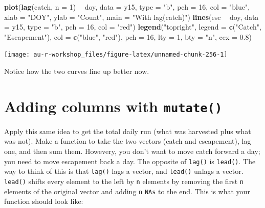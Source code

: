\documentclass[]{book}
\newenvironment{Shaded}{\begin{snugshade}}{\end{snugshade}}
\newcommand{\DataTypeTok}[1]{\textcolor[rgb]{0.13,0.29,0.53}{#1}}
\newcommand{\DecValTok}[1]{\textcolor[rgb]{0.00,0.00,0.81}{#1}}
\newcommand{\FloatTok}[1]{\textcolor[rgb]{0.00,0.00,0.81}{#1}}
\newcommand{\KeywordTok}[1]{\textcolor[rgb]{0.13,0.29,0.53}{\textbf{#1}}}
\newcommand{\NormalTok}[1]{#1}
\newcommand{\OperatorTok}[1]{\textcolor[rgb]{0.81,0.36,0.00}{\textbf{#1}}}
\newcommand{\StringTok}[1]{\textcolor[rgb]{0.31,0.60,0.02}{#1}}
\begin{document}
\begin{Shaded}
\begin{Highlighting}[]
\KeywordTok{plot}\NormalTok{(}\KeywordTok{lag}\NormalTok{(catch, }\DataTypeTok{n =} \DecValTok{1}\NormalTok{) }\OperatorTok{~}\StringTok{ }\NormalTok{doy, }\DataTypeTok{data =}\NormalTok{ y15, }\DataTypeTok{type =} \StringTok{"b"}\NormalTok{, }\DataTypeTok{pch =} \DecValTok{16}\NormalTok{, }\DataTypeTok{col =} \StringTok{"blue"}\NormalTok{,}
     \DataTypeTok{xlab =} \StringTok{"DOY"}\NormalTok{, }\DataTypeTok{ylab =} \StringTok{"Count"}\NormalTok{, }\DataTypeTok{main =} \StringTok{"With lag(catch)"}\NormalTok{)}
\KeywordTok{lines}\NormalTok{(esc }\OperatorTok{~}\StringTok{ }\NormalTok{doy, }\DataTypeTok{data =}\NormalTok{ y15, }\DataTypeTok{type =} \StringTok{"b"}\NormalTok{, }\DataTypeTok{pch =} \DecValTok{16}\NormalTok{, }\DataTypeTok{col =} \StringTok{"red"}\NormalTok{)}
\KeywordTok{legend}\NormalTok{(}\StringTok{"topright"}\NormalTok{, }\DataTypeTok{legend =} \KeywordTok{c}\NormalTok{(}\StringTok{"Catch"}\NormalTok{, }\StringTok{"Escapement"}\NormalTok{),}
       \DataTypeTok{col =} \KeywordTok{c}\NormalTok{(}\StringTok{"blue"}\NormalTok{, }\StringTok{"red"}\NormalTok{), }\DataTypeTok{pch =} \DecValTok{16}\NormalTok{, }\DataTypeTok{lty =} \DecValTok{1}\NormalTok{, }\DataTypeTok{bty =} \StringTok{"n"}\NormalTok{, }\DataTypeTok{cex =} \FloatTok{0.8}\NormalTok{)}
\end{Highlighting}
\end{Shaded}

\begin{center}\texttt{[image: au-r-workshop\_files/figure-latex/unnamed-chunk-256-1]} \end{center}

Notice how the two curves line up better now.

\hypertarget{adding-columns-with-mutate}{%
\section{\texorpdfstring{Adding columns with \texttt{mutate()}}{Adding columns with mutate()}}\label{adding-columns-with-mutate}}

Apply this same idea to get the total daily run (what was harvested plus what was not). Make a function to take the two vectors (catch and escapement), lag one, and then sum them. Howevery, you don't want to move catch forward a day; you need to move escapement back a day. The opposite of \texttt{lag()} is \texttt{lead()}. The way to think of this is that \texttt{lag()} lags a vector, and \texttt{lead()} unlags a vector. \texttt{lead()} shifts every element to the left by \texttt{n} elements by removing the first \texttt{n} elements of the original vector and adding \texttt{n} \texttt{NAs} to the end. This is what your function should look like:
\end{document}
